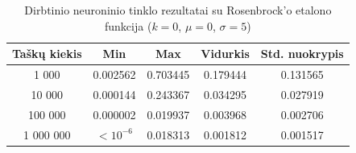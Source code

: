 \begin{table}[H]
    \centering
    \begin{tabular}{|c|c|c|c|c|}
        \hline
        \textbf{Taškų kiekis} & \textbf{Min} & \textbf{Max} & \textbf{Vidurkis} & \textbf{Std. nuokrypis} \\ \hline
        1 000        & 0.002562 & 0.703445 & 0.179444 & 0.131565 \\ \hline
        10 000       & 0.000144 & 0.243367 & 0.034295 & 0.027919 \\ \hline
        100 000      & 0.000002 & 0.019937 & 0.003968 & 0.002706 \\ \hline
        1 000 000    & $<10^{-6}$ & 0.018313 & 0.001812 & 0.001517 \\ \hline
    \end{tabular}
    \caption{Dirbtinio neuroninio tinklo rezultatai su Rosenbrock'o etalono funkcija ($k = 0$, $\mu = 0$, $\sigma = 5$)}
\end{table}